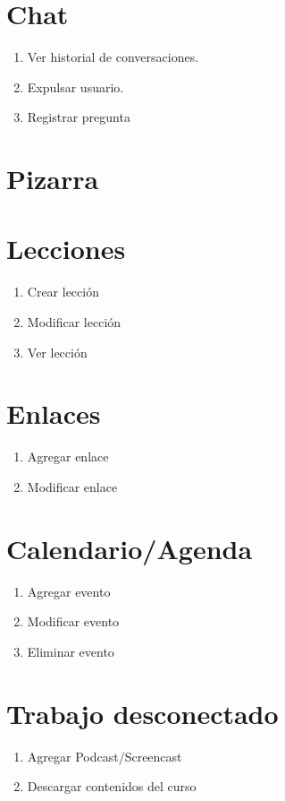 \documentclass{article}
\begin{document}
\section{Chat}
\begin{enumerate}
	\item Ver historial de conversaciones.
	\item Expulsar usuario.
	\item Registrar pregunta
\end{enumerate}

\section{Pizarra}

\section{Lecciones}
\begin{enumerate}
	\item Crear lección
	\item Modificar lección
	\item Ver lección
\end{enumerate}

\section{Enlaces}
\begin{enumerate}
	\item Agregar enlace
	\item Modificar enlace
\end{enumerate}

\section{Calendario/Agenda}
\begin{enumerate}
	\item Agregar evento
	\item Modificar evento
	\item Eliminar evento
\end{enumerate}

\section{Trabajo desconectado}
\begin{enumerate}
	\item Agregar Podcast/Screencast
	\item Descargar contenidos del curso
\end{enumerate}
\end{document}
